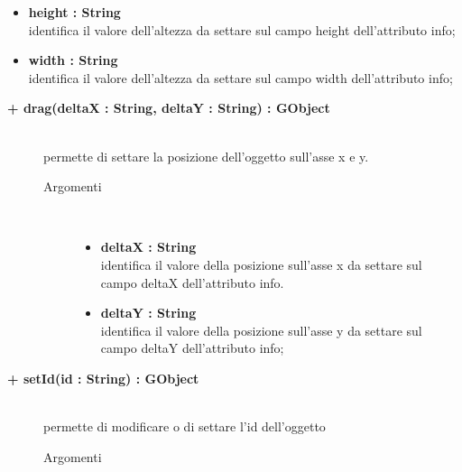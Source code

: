 \begin{description}
\begin{description}
\begin{description}
\begin{itemize}
					\item \textbf{height : String			} \hfill \\
					identifica il valore dell'altezza da settare sul campo height dell'attributo info;
					\item \textbf{width : String			} \hfill \\
					identifica il valore dell'altezza da settare sul campo width dell'attributo info;				
				\end{itemize}
		\end{description}
		
\end{description}

\begin{description}
		\item[\textbf{\color{blue}+ drag(deltaX : String, deltaY : String) : GObject			}] \hfill \\
			permette di settare la posizione dell'oggetto sull'asse x e y.
			
		\begin{description}
			\item[Argomenti] \hfill \\
				\begin{itemize}
				
					\item \textbf{deltaX : String			} \hfill \\
					identifica il valore della posizione sull'asse x da settare sul campo deltaX dell'attributo info.
					\item \textbf{deltaY : String			} \hfill \\
					identifica il valore della posizione sull'asse y da settare sul campo deltaY dell'attributo info;				
				\end{itemize}
		\end{description}
		
\end{description}

\begin{description}
		\item[\textbf{\color{blue}+ setId(id : String) : GObject			}] \hfill \\
			permette di modificare o di settare l'id dell'oggetto
			
		\begin{description}
			\item[Argomenti] \hfill \\
				\begin{itemize}
				

\end{itemize}
\end{description}
\end{description}
\end{description}
